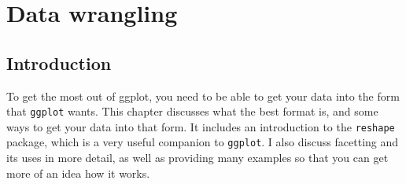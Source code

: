 

\chapter{Data wrangling}

% 
% 
% 
% 
% 
% 
% 
% 
% 
% 


\section{Introduction}\label{sec:introduction}

To get the most out of ggplot, you need to be able to get your data into the form that {\tt ggplot} wants.  This chapter discusses what the best format is, and some ways to get your data into that form.  It includes an introduction to the {\tt reshape} package, which is a very useful companion to {\tt ggplot}.  I also discuss facetting and its uses in more detail, as well as providing many examples so that you can get more of an idea how it works.

